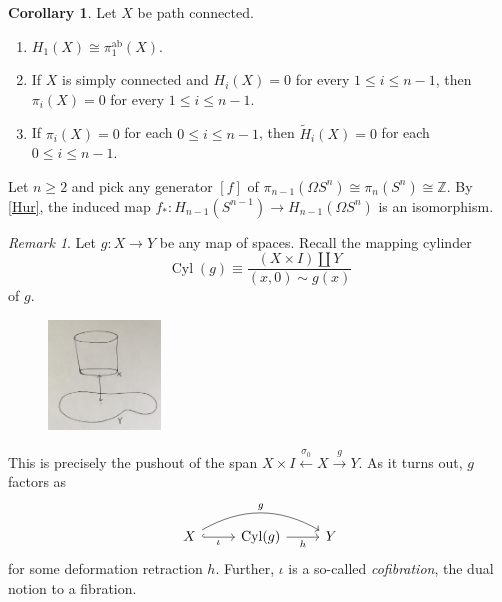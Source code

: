 \documentclass[10pt,letterpaper,cm]{nupset}
\theoremstyle{definition}
\theoremstyle{theorem}
\newtheorem{corollary}[defn]{Corollary}
\theoremstyle{remark}
\newtheorem{remark}[defn]{Remark}
\newcommand{\Z}{\mathbb Z}
\newcommand{\1}{\mathbb{1}}
\newcommand{\0}{\vec 0}
\DeclareMathOperator{\ab}{ab}
\DeclareMathOperator{\cyl}{Cyl}
\newcommand{\be}{\begin{enumerate}}
\newcommand{\ee}{\end{enumerate}}
\begin{document}
\begin{corollary}\label{Hcor} Let $X$ be path connected.
\be
\item $H_1(X) \cong  \pi_1^{\ab}(X)$.
\item If $X$ is simply connected and $H_i(X) =0$ for every $1\leq i \leq n-1$, then $\pi_i(X) =0$ for every $1\leq i\leq n-1$.
\item If $\pi_i(X) =0$ for each $0\leq i \leq n-1$, then $\widetilde{H}_i(X) =0$ for each $0 \leq i \leq n-1$. 
\ee
\end{corollary}

\smallskip

Let $n\geq 2$ and pick any generator $\left[f\right]$ of $\pi_{n-1}(\Omega{S^n}) \cong \pi_n(S^n) \cong \Z$. By \cref{Hur}, the induced map $f_{\ast} : H_{n-1}(S^{n-1}) \to H_{n-1}(\Omega{S^n})$ is an isomorphism.

\begin{remark}
Let $g: X \to Y$ be any map of spaces. Recall the mapping cylinder 
\[
\cyl(g) \equiv \frac{\left(X \times I\right) \coprod Y}{\left(x,0\right)\sim g(x)}
\]
of $g$. 

\begin{figure}[H]
\centering
\includegraphics[width=30mm]{map-cyl.jpg}
\end{figure}

This is precisely the pushout of the span $X \times I \overset{\sigma_0}{\longleftarrow} X \overset{g}{\longrightarrow} Y$. As it turns out, $g$ factors as
\[
\begin{tikzcd}
X \arrow[rr, "g", bend left] \arrow[r, "\iota"', hook] & \cyl(g) \arrow[r, "h"'] & Y
\end{tikzcd}
\] for some deformation retraction $h$. Further, $\iota$ is a so-called \textit{cofibration}, the dual notion to a fibration.
\end{remark}

\smallskip
\end{document}
